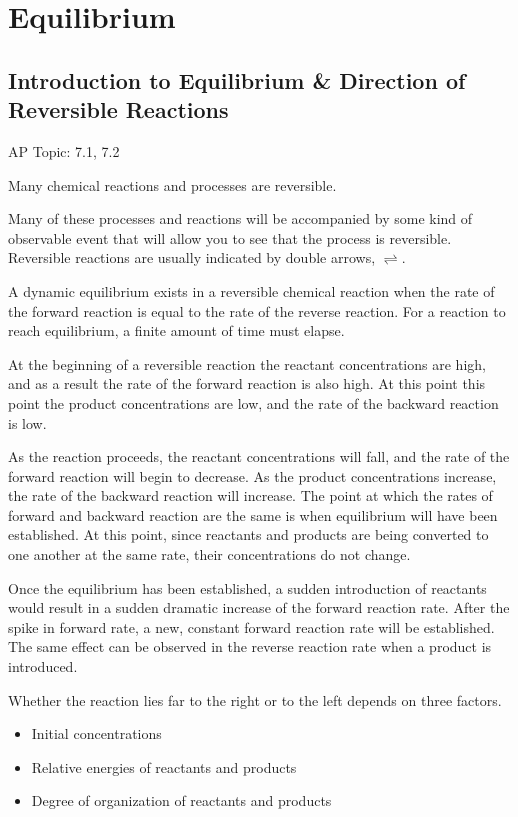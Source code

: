 \documentclass[../chem.tex]{subfiles}
\begin{document}
\chapter{Equilibrium}
\section{Introduction to Equilibrium \& Direction of Reversible Reactions}
AP Topic: 7.1, 7.2

Many chemical reactions and processes are reversible. 

Many of these processes and reactions will be accompanied by some kind of observable event that will allow you to see that the process
is reversible. Reversible reactions are usually indicated by double arrows, $\rightleftharpoons$.

A dynamic equilibrium exists in a reversible chemical reaction when the rate of the forward reaction is equal to the rate of the reverse reaction.
For a reaction to reach equilibrium, a finite amount of time must elapse.

At the beginning of a reversible reaction the reactant concentrations are high, and as a result the rate of the forward reaction is also high.
At this point this point the product concentrations are low, and the rate of the backward reaction is low.

As the reaction proceeds, the reactant concentrations will fall, and the rate of the forward reaction will begin to decrease. As the product 
concentrations increase, the rate of the backward reaction will increase. The point at which the rates of forward and backward reaction are the same is when 
equilibrium will have been established. At this point, since reactants and products are being converted to one another at the same rate, 
their concentrations do not change.

Once the equilibrium has been established, a sudden introduction of reactants would result in a sudden dramatic increase of the forward reaction rate. 
After the spike in forward rate, a new, constant forward reaction rate will be established. The same effect can be observed in the reverse reaction rate 
when a product is introduced. 

Whether the reaction lies far to the right or to the left depends on three factors.
\begin{itemize}
    \item Initial concentrations 
    \item Relative energies of reactants and products 
    \item Degree of organization of reactants and products
\end{itemize}
\end{document}
